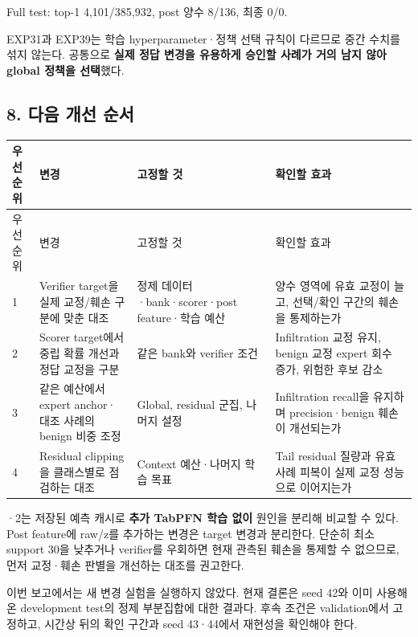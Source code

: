 \par\noindent \textbullet\enspace Full test: top-1 4,101/\allowbreak{}385,932, post 양수 8/\allowbreak{}136, 최종 0/\allowbreak{}0.


EXP31과 EXP39는 학습 hyperparameter·정책 선택 규칙이 다르므로 중간 수치를 섞지 않는다. 공통으로 \textbf{실제 정답 변경을 유용하게 승인할 사례가 거의 남지 않아 global 정책을 선택}했다.

\subsection{8. 다음 개선 순서}
\begingroup
\footnotesize
\begin{longtable}{>{\raggedleft\arraybackslash}p{}>{\raggedright\arraybackslash}p{}>{\raggedright\arraybackslash}p{}>{\raggedright\arraybackslash}p{}}
\toprule
우선순위 & 변경 & 고정할 것 & 확인할 효과 \\ \midrule
\endfirsthead
우선순위 & 변경 & 고정할 것 & 확인할 효과 \\ \midrule
\endhead
{}1 & Verifier target을 실제 교정/\allowbreak{}훼손 구분에 맞춘 대조 & 정제 데이터·bank·scorer·post feature·학습 예산 & 양수 영역에 유효 교정이 늘고, 선택/\allowbreak{}확인 구간의 훼손을 통제하는가 \\
{}2 & Scorer target에서 중립 확률 개선과 정답 교정을 구분 & 같은 bank와 verifier 조건 & Infiltration 교정 유지, benign 교정 expert 회수 증가, 위험한 후보 감소 \\
{}3 & 같은 예산에서 expert anchor·대조 사례의 benign 비중 조정 & Global, residual 군집, 나머지 설정 & Infiltration recall을 유지하며 precision·benign 훼손이 개선되는가 \\
{}4 & Residual clipping을 클래스별로 점검하는 대조 & Context 예산·나머지 학습 목표 & Tail residual 질량과 유효 사례 피복이 실제 교정 성능으로 이어지는가 \\
\bottomrule
\end{longtable}
·2는 저장된 예측 캐시로 \textbf{추가 TabPFN 학습 없이} 원인을 분리해 비교할 수 있다. Post feature에 raw/\allowbreak{}z를 추가하는 변경은 target 변경과 분리한다. 단순히 최소 support 30을 낮추거나 verifier를 우회하면 현재 관측된 훼손을 통제할 수 없으므로, 먼저 교정·훼손 판별을 개선하는 대조를 권고한다.

이번 보고에서는 새 변경 실험을 실행하지 않았다. 현재 결론은 seed 42와 이미 사용해 온 development test의 정제 부분집합에 대한 결과다. 후속 조건은 validation에서 고정하고, 시간상 뒤의 확인 구간과 seed 43·44에서 재현성을 확인해야 한다.

